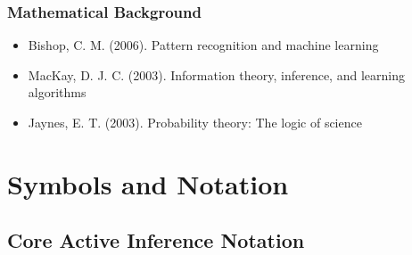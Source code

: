 \documentclass[
]{article}
\providecommand{\tightlist}{%
  \setlength{\itemsep}{0pt}\setlength{\parskip}{0pt}}
\begin{document}
\subsubsection{Mathematical Background}\label{mathematical-background}

\begin{itemize}
\tightlist
\item
  Bishop, C. M. (2006). Pattern recognition and machine learning
\item
  MacKay, D. J. C. (2003). Information theory, inference, and learning
  algorithms
\item
  Jaynes, E. T. (2003). Probability theory: The logic of science
\end{itemize}

\newpage

\section{Symbols and Notation}\label{sec:symbols_glossary}

\subsection{Core Active Inference
Notation}\label{core-active-inference-notation}
\end{document}
